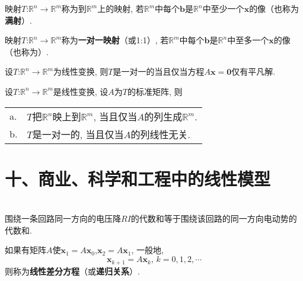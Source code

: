 \begin{definition}
映射$T$:$\mathbb{R}^n\rightarrow\mathbb{R}^m$称为到$\mathbb{R}^m$上的映射, 若$\mathbb{R}^m$中每个$\bm{b}$是$\mathbb{R}^n$中至少一个$\bm{x}$的像（也称为\textbf{满射}）.
\end{definition}\vspace{4ex}

\begin{definition}
映射$T$:$\mathbb{R}^n\rightarrow\mathbb{R}^m$称为\textbf{一对一映射}（或1:1）, 若$\mathbb{R}^m$中每个$\bm{b}$是$\mathbb{R}^n$中至多一个$\bm{x}$的像（也称为）.
\end{definition}\vspace{4ex}

\begin{theorem}
设$T$:$\mathbb{R}^n\rightarrow\mathbb{R}^m$为线性变换, 则$T$是一对一的当且仅当方程$A\bm{x}=\bm{0}$仅有平凡解.
\end{theorem}\vspace{4ex}

\begin{theorem}
设$T$:$\mathbb{R}^n\rightarrow\mathbb{R}^m$是线性变换, 设$A$为$T$的标准矩阵, 则\\
\begin{tabular}{l@{\ }l}
a. & $T$把$\mathbb{R}^n$映上到$\mathbb{R}^m$, 当且仅当$A$的列生成$\mathbb{R}^m$.\\
b. & $T$是一对一的, 当且仅当$A$的列线性无关.
\end{tabular}
\end{theorem}\vspace{6ex}

\section{十、商业、科学和工程中的线性模型}
\begin{law}[基尔霍夫电压定律]\ \\
围绕一条回路同一方向的电压降$RI$的代数和等于围绕该回路的同一方向电动势的代数和.
\end{law}\vspace{4ex}

\begin{law}
如果有矩阵$A$使$\bm{x}_1=A\bm{x}_0$,$\bm{x}_2=A\bm{x}_1$, 一般地,
\[\bm{x}_{k+1}=A\bm{x}_k\text{,\ }k=0,1,2,\cdots\]
则称为\textbf{线性差分方程}（或\textbf{递归关系}）.
\end{law}
